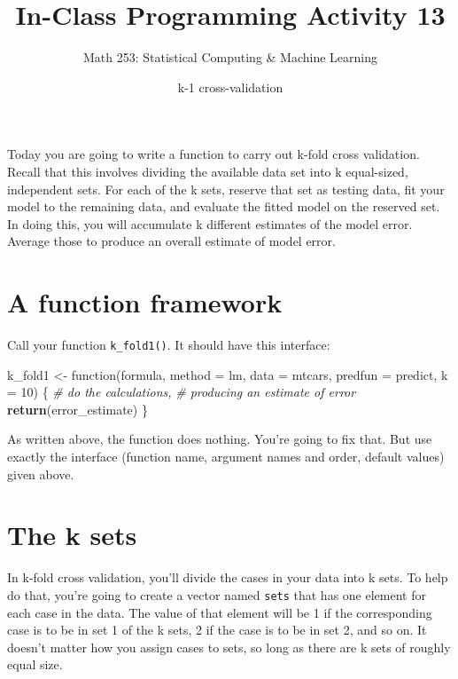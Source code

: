 \documentclass[]{tufte-handout}
\title{In-Class Programming Activity 13}
\author{Math 253: Statistical Computing \& Machine Learning}
\date{k-1 cross-validation}
\newenvironment{Shaded}{}{}
\newcommand{\KeywordTok}[1]{\textcolor[rgb]{0.00,0.44,0.13}{\textbf{{#1}}}}
\newcommand{\DataTypeTok}[1]{\textcolor[rgb]{0.56,0.13,0.00}{{#1}}}
\newcommand{\DecValTok}[1]{\textcolor[rgb]{0.25,0.63,0.44}{{#1}}}
\newcommand{\StringTok}[1]{\textcolor[rgb]{0.25,0.44,0.63}{{#1}}}
\newcommand{\CommentTok}[1]{\textcolor[rgb]{0.38,0.63,0.69}{\textit{{#1}}}}
\newcommand{\NormalTok}[1]{{#1}}
\begin{document}
\maketitle




Today you are going to write a function to carry out k-fold cross
validation. Recall that this involves dividing the available data set
into k equal-sized, independent sets. For each of the k sets, reserve
that set as testing data, fit your model to the remaining data, and
evaluate the fitted model on the reserved set. In doing this, you will
accumulate k different estimates of the model error. Average those to
produce an overall estimate of model error.

\section{A function framework}\label{a-function-framework}

Call your function \texttt{k\_fold1()}. It should have this interface:

\begin{Shaded}
\begin{Highlighting}[]
\NormalTok{k_fold1 <-}\StringTok{ }\NormalTok{function(formula, }\DataTypeTok{method =} \NormalTok{lm, }\DataTypeTok{data =} \NormalTok{mtcars, }\DataTypeTok{predfun =} \NormalTok{predict, }\DataTypeTok{k =} \DecValTok{10}\NormalTok{) \{}
  \CommentTok{# do the calculations, }
  \CommentTok{# producing an estimate of error}
  \KeywordTok{return}\NormalTok{(error_estimate)}
\NormalTok{\}}
\end{Highlighting}
\end{Shaded}

As written above, the function does nothing. You're going to fix that.
But use exactly the interface (function name, argument names and order,
default values) given above.

\section{The k sets}\label{the-k-sets}

In k-fold cross validation, you'll divide the cases in your data into k
sets. To help do that, you're going to create a vector named
\texttt{sets} that has one element for each case in the data. The value
of that element will be 1 if the corresponding case is to be in set 1 of
the k sets, 2 if the case is to be in set 2, and so on. It doesn't
matter how you assign cases to sets, so long as there are k sets of
roughly equal size.
\end{document}
